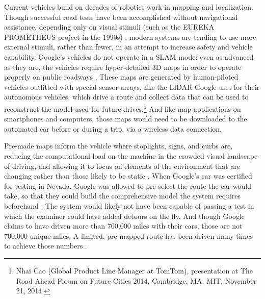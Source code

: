 
Current vehicles build on decades of robotics work in mapping and localization. Though successful
road tests have been accomplished without navigational assistance,
depending only on visual stimuli (such as the EUREKA PROMETHEUS project
in the 1990s) \cite{ulmerVITA}, modern systems are tending to use more external
stimuli, rather than fewer, in an attempt to increase safety and
vehicle capability. Google's vehicles do not operate in a SLAM mode: even as
advanced as they are, the vehicles require
hyper-detailed 3D maps in order to operate properly on public
roadways \cite{gomesObstacles}. These maps are generated by human-piloted vehicles outfitted with
special sensor arrays, like the LIDAR Google uses for their autonomous
vehicles, which drive a route and collect data that can be used to
reconstruct the model used for future drives.\footnote{Nhai Cao
  (Global Product Line Manager at TomTom), presentation at The Road
  Ahead Forum on Future Cities 2014, Cambridge, MA, MIT, November 21,
  2014.} And like map applications on smartphones and computers,
those maps would need to be downloaded to the automated car before or
during a trip, via a wireless data connection.


Pre-made maps inform the vehicle where stoplights, signs,
and curbs are, reducing the computational load on the machine in the
crowded visual landscape of driving, and allowing it to focus on
elements of the environment that are changing rather than those likely
to be static \cite{gomesObstacles}. When Google's car was certified for
testing in Nevada, Google was allowed to pre-select the route the car
would take, so that they could build the comprehensive model the
system requires beforehand \cite{harrisNevada}. The system would likely not have been
capable of passing a test in which the examiner could have added
detours on the fly. And though Google claims to have driven more than
700,000 miles with their cars, those are not 700,000 unique miles. A
limited, pre-mapped route has been driven many times to
achieve those numbers \cite{gomesCircles}.

